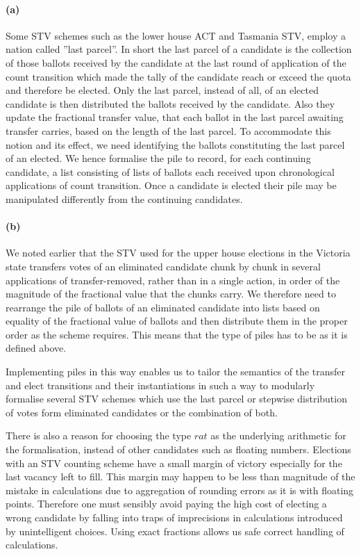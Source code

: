 \documentclass[10pt,conference]{IEEEtran}
\begin{document}
\paragraph*{(a)} Some STV schemes such as the lower house ACT and Tasmania STV, employ a nation called ''last parcel''. In short the last parcel of a candidate is the collection of those ballots received by the candidate at the last round of application of the count transition which made the tally of the candidate reach or exceed the quota and therefore be elected.  Only the last parcel, instead of all, of an elected candidate is then distributed the ballots received by the candidate. Also  they update the fractional transfer value, that each ballot in the last parcel  awaiting transfer carries, based on the length of the last parcel. To  accommodate this notion and its effect, we need identifying the ballots constituting the last parcel of an elected. We hence formalise the pile to record, for each  continuing candidate, a list consisting of lists of ballots each received upon  chronological applications of count transition.  Once a candidate is elected their pile may be manipulated differently from the continuing candidates. 
\paragraph*{(b)} We noted earlier that the STV used for the upper house elections in the Victoria state transfers votes of an eliminated candidate chunk by chunk in several applications of transfer-removed, rather than in a single action, in order of the magnitude of the fractional value that the chunks carry. We therefore need to rearrange the pile of ballots of an eliminated candidate into lists based on equality of the fractional value of ballots and then distribute them in the proper order as the scheme requires. This means that the type of piles has to be as it is defined above.  

Implementing piles in this way enables us to tailor the semantics of the transfer and elect transitions and their instantiations in such a way to modularly formalise several STV schemes which use the last parcel or stepwise distribution of votes form eliminated candidates or the combination of both. 


There is also a reason for choosing the type $rat$ as the underlying arithmetic for the formalisation, instead of other candidates such as floating numbers. Elections with an STV counting scheme have a small margin of victory especially for the last vacancy left to fill. This margin may happen to be less than magnitude of the mistake in calculations due to  aggregation of rounding errors as it is with floating points.  Therefore one must sensibly avoid paying the high  cost of electing a wrong candidate by falling into traps of imprecisions in calculations introduced by unintelligent choices. Using exact fractions allows us safe  correct handling of calculations. 
\end{document}
